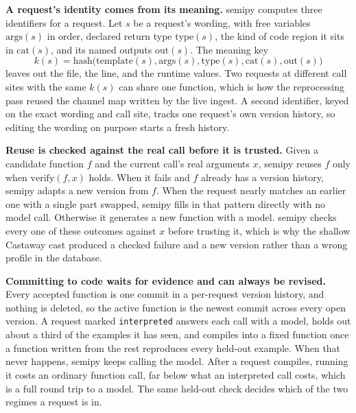 \documentclass[9pt]{extarticle}
\begin{document}
\textbf{A request's identity comes from its meaning.} semipy computes three
identifiers for a request. Let $s$ be a request's wording, with free
variables $\mathrm{args}(s)$ in order, declared return type $\mathrm{type}(s)$,
the kind of code region it sits in $\mathrm{cat}(s)$, and its named outputs
$\mathrm{out}(s)$. The meaning key
\[
k(s) = \mathrm{hash}\big(\mathrm{template}(s), \mathrm{args}(s),
\mathrm{type}(s), \mathrm{cat}(s), \mathrm{out}(s)\big)
\]
leaves out the file, the line, and the runtime values. Two requests at
different call sites with the same $k(s)$ can share one function, which is how
the reprocessing pass reused the channel map written by the live ingest. A
second identifier, keyed on the exact wording and call site, tracks one
request's own version history, so editing the wording on purpose starts a
fresh history.

\textbf{Reuse is checked against the real call before it is trusted.} Given a
candidate function $f$ and the current call's real arguments $x$, semipy
reuses $f$ only when $\mathrm{verify}(f, x)$ holds. When it fails and $f$
already has a version history, semipy adapts a new version from $f$. When the
request nearly matches an earlier one with a single part swapped, semipy fills
in that pattern directly with no model call. Otherwise it generates a new
function with a model. semipy checks every one of these outcomes against $x$
before trusting it, which is why the shallow Castaway cast produced a checked
failure and a new version rather than a wrong profile in the database.

\textbf{Committing to code waits for evidence and can always be revised.}
Every accepted function is one commit in a per-request version history, and
nothing is deleted, so the active function is the newest commit across every
open version. A request marked \texttt{interpreted} answers each call with a
model, holds out about a third of the examples it has seen, and compiles into
a fixed function once a function written from the rest reproduces every
held-out example. When that never happens, semipy keeps calling the model.
After a request compiles, running it costs an ordinary function call, far
below what an interpreted call costs, which is a full round trip to a model.
The same held-out check decides which of the two regimes a request is in.
\end{document}
